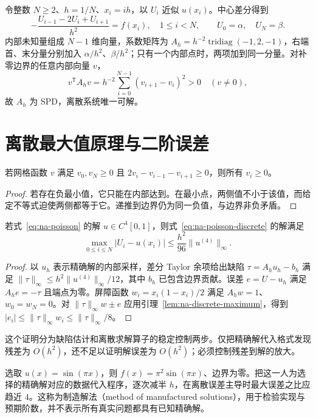 \documentclass[UTF8,12pt,a4paper,fontset=fandol]{ctexbook}
\begin{document}
令整数 $N\ge2$、$h=1/N$、$x_i=ih$，以 $U_i$ 近似 $u(x_i)$。中心差分得到
\begin{equation}
 -\frac{U_{i-1}-2U_i+U_{i+1}}{h^2}=f(x_i),\quad1\le i<N,
 \qquad U_0=\alpha,\quad U_N=\beta.
 \label{eq:na-poisson-discrete}
\end{equation}
内部未知量组成 $N-1$ 维向量，系数矩阵为 $A_h=h^{-2}\operatorname{tridiag}(-1,2,-1)$，右端首、末分量分别加入 $\alpha/h^2$、$\beta/h^2$；只有一个内部点时，两项加到同一分量。对补零边界的任意内部向量 $v$，
\[
 v^{\mathsf T}A_hv=h^{-2}\sum_{i=0}^{N-1}(v_{i+1}-v_i)^2>0\quad(v\ne0),
\]
故 $A_h$ 为 SPD，离散系统唯一可解。

\section{离散最大值原理与二阶误差}
\begin{lemma}[离散比较原理]
\label{lem:na-discrete-maximum}
若网格函数 $v$ 满足 $v_0,v_N\ge0$ 且 $2v_i-v_{i-1}-v_{i+1}\ge0$，则所有 $v_i\ge0$。
\end{lemma}
\begin{proof}
若存在负最小值，它只能在内部达到。在最小点，两侧值不小于该值，而给定不等式迫使两侧都等于它。递推到边界仍为同一负值，与边界非负矛盾。
\end{proof}

\begin{theorem}
若式~\eqref{eq:na-poisson} 的解 $u\in C^4[0,1]$，则式~\eqref{eq:na-poisson-discrete} 的解满足
\[
 \max_{0\le i\le N}|U_i-u(x_i)|\le\frac{h^2}{96}\|u^{(4)}\|_\infty.
\]
\end{theorem}
\begin{proof}
以 $u_h$ 表示精确解的内部采样，差分 Taylor 余项给出缺陷 $\tau=A_hu_h-b_h$ 满足 $\|\tau\|_\infty\le h^2\|u^{(4)}\|_\infty/12$，其中 $b_h$ 已包含边界贡献。误差 $e=U-u_h$ 满足 $A_he=-\tau$ 且端点为零。屏障函数 $w_i=x_i(1-x_i)/2$ 满足 $A_hw=1$、$w_0=w_N=0$。对 $\|\tau\|_\infty w\pm e$ 应用引理~\ref{lem:na-discrete-maximum}，得到 $|e_i|\le\|\tau\|_\infty w_i\le\|\tau\|_\infty/8$。
\end{proof}

这个证明分为缺陷估计和离散求解算子的稳定控制两步。仅把精确解代入格式发现残差为 $O(h^2)$，还不足以证明解误差为 $O(h^2)$；必须控制残差到解的放大。

\begin{example}[制造解检验]
选取 $u(x)=\sin(\pi x)$，则 $f(x)=\pi^2\sin(\pi x)$、边界为零。把这一人为选择的精确解对应的数据代入程序，逐次减半 $h$，在离散误差主导时最大误差之比应趋近 $4$。这称为制造解法（method of manufactured solutions），用于检验实现与预期阶数，并不表示所有真实问题都具有已知精确解。
\end{example}
\end{document}
